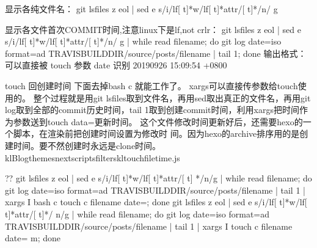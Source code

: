 \documentclass[letterpaper,12pt,english]{sphinxmanual}
\begin{document}
\begin{sphinxVerbatim}[commandchars=\\\{\}]
显示各纯文件名：
git ls\PYGZhy{}files \PYGZhy{}z \PYGZhy{}\PYGZhy{}eol | sed \PYGZhy{}e \PYGZdq{}s/i\PYGZbs{}/lf[ \PYGZbs{}t]*w\PYGZbs{}/lf[ \PYGZbs{}t]*attr\PYGZbs{}/[ \PYGZbs{}t]*/\PYGZbs{}n/  g\PYGZdq{}

显示各文件首次COMMIT时间,注意linux下是lf,not crlr：
git ls\PYGZhy{}files \PYGZhy{}z \PYGZhy{}\PYGZhy{}eol | sed \PYGZhy{}e \PYGZdq{}s/i\PYGZbs{}/lf[ \PYGZbs{}t]*w\PYGZbs{}/lf[ \PYGZbs{}t]*attr\PYGZbs{}/[ \PYGZbs{}t]*/\PYGZbs{}n/  g\PYGZdq{} | while read filename; do git log \PYGZhy{}\PYGZhy{}date=iso \PYGZhy{}\PYGZhy{}format=\PYGZdq{}\PYGZpc{}ad\PYGZdq{} \PYGZhy{}\PYGZhy{}   \PYGZdq{}\PYGZdl{}TRAVIS\PYGZus{}BUILD\PYGZus{}DIR/source/\PYGZus{}posts/\PYGZdl{}filename\PYGZdq{} | tail \PYGZhy{}1; done
输出格式：可以直接被 touch 参数 \PYGZhy{}\PYGZhy{}date \PYGZdq{}\PYGZdq{}识别
2019\PYGZhy{}09\PYGZhy{}26 15:09:54 +0800

\PYGZsh{} touch 回创建时间
\PYGZsh{} 下面去掉bash \PYGZhy{}c 就能工作了。 xargs可以直接传参数给touch使用的。
\PYGZsh{} 整个过程就是用git ls\PYGZhy{}files取到文件名，再用sed取出真正的文件名，再用git   log取到全部的commit历史时间，tail   \PYGZhy{}1取到创建commit时间，利用xargs把时间作为参数送到touch \PYGZhy{}data=\PYGZdq{}\PYGZdq{}更新时间。
\PYGZsh{} 这个文件修改时间更新好后，还需要hexo的一个脚本，在渲染前把创建时间设置为修改时  间。因为hexo的archive排序用的是创建时间。要不然创建时永远是clone时间。
\PYGZsh{} klBlog\PYGZbs{}themes\PYGZbs{}next\PYGZbs{}scripts\PYGZbs{}filters\PYGZbs{}kl\PYGZhy{}touch\PYGZhy{}file\PYGZhy{}time.js

\PYGZsh{} ?? \PYGZhy{} git ls\PYGZhy{}files \PYGZhy{}z \PYGZhy{}\PYGZhy{}eol | sed \PYGZhy{}e \PYGZdq{}s/i\PYGZbs{}/lf[ \PYGZbs{}t]*w\PYGZbs{}/lf[ \PYGZbs{}t]*attr\PYGZbs{}/[ \PYGZbs{}t]  */\PYGZbs{}n/g\PYGZdq{} | while read filename; do git log \PYGZhy{}\PYGZhy{}date=iso \PYGZhy{}\PYGZhy{}format=\PYGZdq{}\PYGZpc{}ad\PYGZdq{} \PYGZhy{}\PYGZhy{}   \PYGZdq{}\PYGZdl{}TRAVIS\PYGZus{}BUILD\PYGZus{}DIR/source/\PYGZus{}posts/\PYGZdl{}filename\PYGZdq{} | tail \PYGZhy{}1 | xargs \PYGZhy{}I\PYGZob{}\PYGZcb{} bash   \PYGZhy{}c \PYGZsq{}touch \PYGZhy{}c \PYGZdl{}filename \PYGZhy{}\PYGZhy{}date=\PYGZdq{}\PYGZob{}\PYGZcb{}\PYGZdq{}\PYGZsq{}; done
  \PYGZhy{} git ls\PYGZhy{}files \PYGZhy{}z \PYGZhy{}\PYGZhy{}eol | sed \PYGZhy{}e \PYGZdq{}s/i\PYGZbs{}/lf[ \PYGZbs{}t]*w\PYGZbs{}/lf[ \PYGZbs{}t]*attr\PYGZbs{}/[ \PYGZbs{}t]*/  \PYGZbs{}n/g\PYGZdq{} | while read filename; do git log \PYGZhy{}\PYGZhy{}date=iso \PYGZhy{}\PYGZhy{}format=\PYGZdq{}\PYGZpc{}ad\PYGZdq{} \PYGZhy{}\PYGZhy{}   \PYGZdq{}\PYGZdl{}TRAVIS\PYGZus{}BUILD\PYGZus{}DIR/source/\PYGZus{}posts/\PYGZdl{}filename\PYGZdq{} | tail \PYGZhy{}1 | xargs \PYGZhy{}I\PYGZob{}\PYGZcb{}   touch \PYGZhy{}c \PYGZdl{}filename \PYGZhy{}\PYGZhy{}date=\PYGZdq{}\PYGZob{}\PYGZcb{}\PYGZdq{} \PYGZhy{}m; done
\end{sphinxVerbatim}
\end{document}
